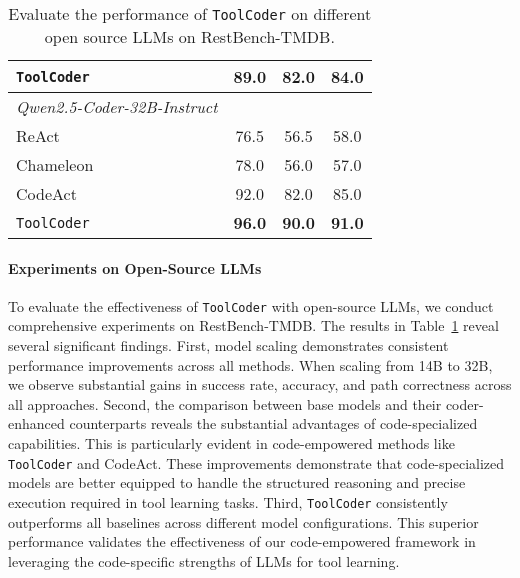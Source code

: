 \begin{table}[t]
{\begin{tabular}{lccc}
\texttt{ToolCoder} & \textbf{89.0} & \textbf{82.0} & \textbf{84.0} \\
\midrule
\rowcolor{mygray}
\textit{Qwen2.5-Coder-32B-Instruct}  &    &   &   \\
ReAct~\cite{DBLP:conf/iclr/YaoZYDSN023} & 76.5 & 56.5 & 58.0 \\ 
Chameleon~\cite{DBLP:conf/nips/LuPCGCWZG23} & 78.0 & 56.0 & 57.0 \\ 
CodeAct~\cite{DBLP:conf/icml/WangCY0L0J24}  & 92.0 & 82.0 & 85.0 \\
\texttt{ToolCoder} & \textbf{96.0} & \textbf{90.0} & \textbf{91.0} \\
\bottomrule
\end{tabular}}
\caption{Evaluate the performance of \texttt{ToolCoder} on different open source LLMs on RestBench-TMDB.}
\label{tab:opensource_lms}
\end{table}

\paragraph{Experiments on Open-Source LLMs}
To evaluate the effectiveness of \texttt{ToolCoder} with open-source LLMs, we conduct comprehensive experiments on RestBench-TMDB. The results in Table~\ref{tab:opensource_lms} reveal several significant findings. First, model scaling demonstrates consistent performance improvements across all methods. When scaling from 14B to 32B, we observe substantial gains in success rate, accuracy, and path correctness across all approaches. Second, the comparison between base models and their coder-enhanced counterparts reveals the substantial advantages of code-specialized capabilities. This is particularly evident in code-empowered methods like \texttt{ToolCoder} and CodeAct. These improvements demonstrate that code-specialized models are better equipped to handle the structured reasoning and precise execution required in tool learning tasks. Third, \texttt{ToolCoder} consistently outperforms all baselines across different model configurations. This superior performance validates the effectiveness of our code-empowered framework in leveraging the code-specific strengths of LLMs for tool learning.

